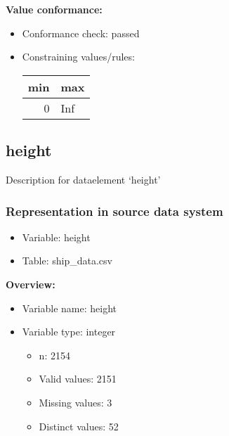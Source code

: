\documentclass[
]{article}
\providecommand{\tightlist}{%
  \setlength{\itemsep}{0pt}\setlength{\parskip}{0pt}}
\begin{document}
\textbf{Value conformance:}

\begin{itemize}
\tightlist
\item
  Conformance check: passed
\item
  Constraining values/rules:

  \begin{table}[H]
  \centering
  \begin{tabular}{r|l}
  \hline
  \textbf{min} & \textbf{max}\\
  \hline
  0 & Inf\\
  \hline
  \end{tabular}
  \end{table}
\end{itemize}

\newpage

\hypertarget{height}{%
\subsection{height}\label{height}}

Description for dataelement `height'

\hypertarget{representation-in-source-data-system-13}{%
\subsubsection{\texorpdfstring{Representation in \textbf{source} data
system}{Representation in source data system}}\label{representation-in-source-data-system-13}}

\begin{itemize}
\tightlist
\item
  Variable: height
\item
  Table: ship\_data.csv
\end{itemize}

\textbf{Overview:}

\begin{itemize}
\tightlist
\item
  Variable name: height
\item
  Variable type: integer

  \begin{itemize}
  \tightlist
  \item
    n: 2154
  \item
    Valid values: 2151
  \item
    Missing values: 3
  \item
    Distinct values: 52
  \end{itemize}
\end{itemize}
\end{document}
